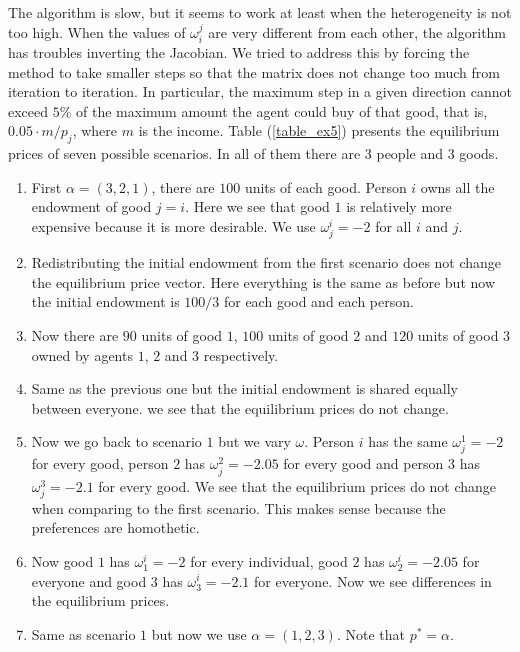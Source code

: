 \documentclass[a4paper,12pt]{article}
\begin{document}
    The algorithm is slow, but it seems to work at least when the heterogeneity is not too high. When the values of $\omega_i^j$ are very different from each other, the algorithm has troubles inverting the Jacobian. We tried to address this by forcing the method to take smaller steps so that the matrix does not change too much from iteration to iteration. In particular, the maximum step in a given direction cannot exceed $5\%$ of the maximum amount the agent could buy of that good, that is, $0.05 \cdot m/p_j$, where $m$ is the income. Table (\ref{table_ex5}) presents the equilibrium prices of seven possible scenarios. In all of them there are $3$ people and $3$ goods.
    
    
    \begin{enumerate}
        \item First $\alpha = (3,2,1)$, there are $100$ units of each good. Person $i$ owns all the endowment of good $j=i$. Here we see that good $1$ is relatively more expensive because it is more desirable. We use $\omega_j^i=-2$ for all $i$ and $j$. 
        \item Redistributing the initial endowment from the first scenario does not change the equilibrium price vector. Here everything is the same as before but now the initial endowment is $100/3$ for each good and each person. 
        \item Now there are $90$ units of good $1$, $100$ units of good $2$ and $120$ units of good $3$ owned by agents $1$, $2$ and $3$ respectively. 
        \item Same as the previous one but the initial endowment is shared equally between everyone. we see that the equilibrium prices do not change.  
        \item Now we go back to scenario $1$ but we vary $\omega$. Person $i$ has the same $\omega_j^1 = -2$ for every good, person $2$ has $\omega_j^2 = -2.05$ for every good and person $3$ has $\omega_j^3 = -2.1$ for every good. We see that the equilibrium prices do not change when comparing to the first scenario. This makes sense because the preferences are homothetic. 
        \item Now good $1$ has $\omega_1^i=-2$ for every individual, good $2$ has $\omega_2^i=-2.05$ for everyone and good $3$ has $\omega_3^i=-2.1$ for everyone. Now we see differences in the equilibrium prices. 
        
        \item Same as scenario $1$ but now we use $\alpha = (1,2,3)$. Note that $p^* = \alpha$. 
    \end{enumerate}
    
\end{document}

